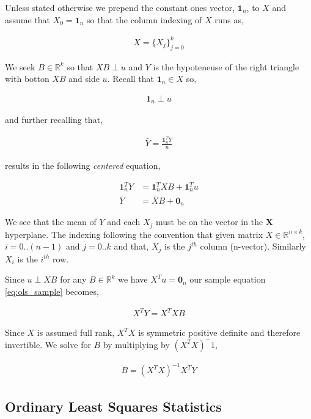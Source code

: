 Unless stated otherwise we prepend the constant ones vector, $\mathbf{1}_n$, to $X$ and assume that $X_0 = \mathbf{1}_n$ so that the column indexing of $X$ runs as,

\begin{align*}
X = \{X_j\}_{j=0}^k
\end{align*}

We seek $B \in \mathbb{R}^k$ so that $XB \perp u$ and $Y$ is the hypoteneuse of the right triangle with botton $XB$ and side $u$. Recall that $\mathbf{1}_n \in X$ so,

\begin{align*}
\mathbf{1}_n \perp u
\end{align*}

and further recalling that,

\begin{align*}
\bar{Y} = \frac{\mathbf{1}_n^T Y}{n} 
\end{align*}

 results in the following \emph{centered} equation,

\begin{align}
\mathbf{1}_n^T Y &= \mathbf{1}_n^T XB + \mathbf{1}_n^T u \\
\label{eq:ols_centered}\bar{Y} &= \bar{X}B + \mathbf{0}_n
\end{align}

We see that the mean of $Y$ and each $X_j$ must be on the vector in the $\mathbf{X}$ hyperplane. The indexing following the convention that given matrix $X \in \mathbb{R}^{n \times k}$, $i = 0..(n-1)$ and $j = 0..k$ and that, $X_j$ is the $j^{th}$ column (n-vector). Similarly $X_i$ is the $i^{th}$ row.

Since $u \perp XB$ for any $B \in \mathbb{R}^k$ we have $X^Tu = \mathbf{0}_n$ our sample equation \ref{eq:ols_sample} becomes,

\begin{align}
\label{eq:ols_score}X^TY = X^TXB
\end{align}

Since $X$ is assumed full rank, $X^TX$ is symmetric positive definite and therefore invertible. We solve for $B$ by multiplying by $(X^TX)^-1$,

\begin{align}
\label{eq:ols_B} B = (X^TX)^{-1}X^T Y
\end{align}

\subsection{Ordinary Least Squares Statistics}

